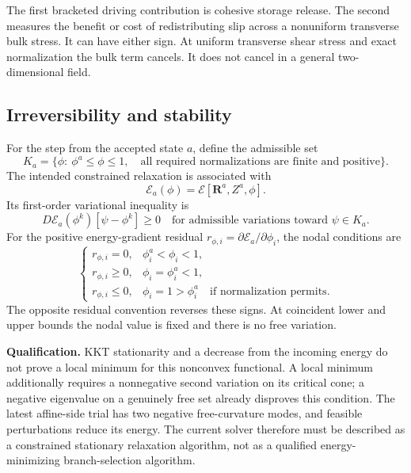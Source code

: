 \documentclass[11pt,a4paper]{article}
\newcommand{\R}{\bm R}
\newcommand{\Ecal}{\mathscr E}
\newcommand{\caution}[1]{\par\smallskip\noindent\textbf{Qualification.} #1\par\smallskip}
\begin{document}
The first bracketed driving contribution is cohesive storage release.
The second measures the benefit or cost of redistributing slip across a
nonuniform transverse bulk stress. It can have either sign.
At uniform transverse shear stress and exact normalization the bulk term
cancels. It does not cancel in a general two-dimensional field.

\subsection{Irreversibility and stability}

For the step from the accepted state $a$, define the admissible set
\begin{equation}
 K_a=\{\phi:\ \phi^a\leq\phi\leq1,\quad
             \text{all required normalizations are finite and positive}\}.
\end{equation}
The intended constrained relaxation is associated with
\begin{equation}
 \Ecal_a(\phi)=\Ecal[\R^a,Z^a,\phi].
\end{equation}
Its first-order variational inequality is
\begin{equation}
 D\Ecal_a(\phi^k)[\psi-\phi^k]\geq0
 \quad\text{for admissible variations toward }\psi\in K_a.
 \label{eq:phase-vi}
\end{equation}
For the positive energy-gradient residual $r_{\phi,i}=\partial\Ecal_a/
\partial\phi_i$, the nodal conditions are
\begin{equation}
 \begin{cases}
 r_{\phi,i}=0,&\phi_i^a<\phi_i<1,\\
 r_{\phi,i}\geq0,&\phi_i=\phi_i^a<1,\\
 r_{\phi,i}\leq0,&\phi_i=1>\phi_i^a\quad\text{if normalization permits}.
 \end{cases}
 \label{eq:phase-kkt}
\end{equation}
The opposite residual convention reverses these signs. At coincident lower
and upper bounds the nodal value is fixed and there is no free variation.

\caution{KKT stationarity and a decrease from the incoming energy do not prove
a local minimum for this nonconvex functional. A local minimum additionally
requires a nonnegative second variation on its critical cone; a negative
eigenvalue on a genuinely free set already disproves this condition. The latest
affine-side trial has two negative free-curvature modes, and feasible
perturbations reduce its energy. The current solver therefore must be described
as a constrained stationary relaxation algorithm, not as a qualified
energy-minimizing branch-selection algorithm.}
\end{document}
